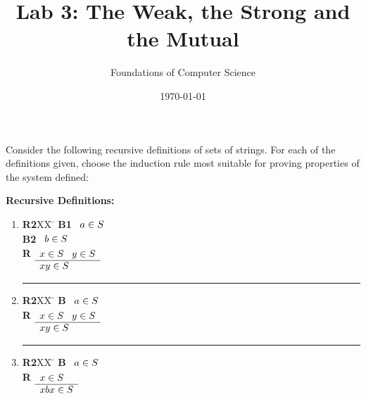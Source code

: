 \documentclass[]{exam}
\title{Lab 3: The Weak, the Strong and the Mutual}
\author{Foundations of Computer Science}
\date{\today}
\begin{document}
\maketitle

\setlength{\columnseprule}{1pt}
\begin{questions}


\question Consider the following recursive definitions of sets of strings. 
For each of the definitions given, choose the induction rule most suitable 
for proving properties of the system defined:
\begin{multicols}{2}
{\bf Recursive Definitions:}\\
\begin{enumerate}
\item
\begin{tabbing}
{\bf R2}XX \=  \kill
{\bf B1} \>
        \(\begin{array}[t]{l}
        a \in S
        \end{array}\) \\[2ex]
{\bf B2} \>
        \(\begin{array}[t]{l}
        b \in S
        \end{array}\) \\[2ex]
{\bf R} \>
        \(\begin{array}[t]{l}
        x \in S \;\;\;y \in S \\
        \hline
        xy \in S
        \end{array}\)
\end{tabbing}
\hrule
\item
\begin{tabbing}
{\bf R2}XX \=  \kill
{\bf B} \>
        \(\begin{array}[t]{l}
        a \in S
        \end{array}\) \\[2ex]
{\bf R} \>
        \(\begin{array}[t]{l}
        x \in S \;\;\;y \in S \\
        \hline
        xy \in S
        \end{array}\)
\end{tabbing}
\hrule

\item
\begin{tabbing}
{\bf R2}XX \=  \kill
{\bf B} \>
        \(\begin{array}[t]{l}
        a \in S
        \end{array}\) \\[2ex]
{\bf R} \>
        \(\begin{array}[t]{l}
        x \in S \\
        \hline
        xbx \in S
        \end{array}\)
\end{tabbing}
\end{enumerate}


\end{multicols}
\end{questions}
\end{document}

